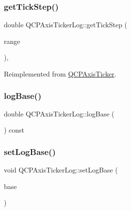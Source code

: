 \mbox{\label{class_q_c_p_axis_ticker_log_a57be974214a065d3247406331f02fa49}} 
\subsubsection{\texorpdfstring{getTickStep()}{getTickStep()}}
{\footnotesize\ttfamily double Q\+C\+P\+Axis\+Ticker\+Log\+::get\+Tick\+Step (\begin{DoxyParamCaption}\item[{const \mbox{\hyperlink{class_q_c_p_range}{Q\+C\+P\+Range}} \&}]{range }\end{DoxyParamCaption})\hspace{0.3cm}{\ttfamily [protected]}, {\ttfamily [virtual]}}



Reimplemented from \mbox{\hyperlink{class_q_c_p_axis_ticker_a910d69bcec2de37e92d8d4e1ecf201e2}{Q\+C\+P\+Axis\+Ticker}}.

\mbox{\label{class_q_c_p_axis_ticker_log_a841a97f2b6850ff1ef3aa73e89d94775}} 
\subsubsection{\texorpdfstring{logBase()}{logBase()}}
{\footnotesize\ttfamily double Q\+C\+P\+Axis\+Ticker\+Log\+::log\+Base (\begin{DoxyParamCaption}{ }\end{DoxyParamCaption}) const\hspace{0.3cm}{\ttfamily [inline]}}

\mbox{\label{class_q_c_p_axis_ticker_log_ac6e3b4e03baea3816f898869ab9751ef}} 
\subsubsection{\texorpdfstring{setLogBase()}{setLogBase()}}
{\footnotesize\ttfamily void Q\+C\+P\+Axis\+Ticker\+Log\+::set\+Log\+Base (\begin{DoxyParamCaption}\item[{double}]{base }\end{DoxyParamCaption})}

